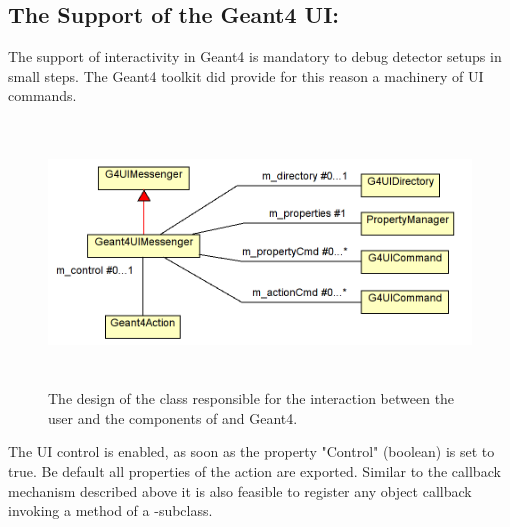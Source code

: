 \newpage
\subsection{The Support of the Geant4 UI: }
\label{sec:ddg4-user-manual-geant4action-base}

\noindent
The support of interactivity in Geant4 is mandatory to debug detector
setups in small steps. The Geant4 toolkit did provide for this reason 
a machinery of UI commands.
\begin{figure}[h]
  \begin{center}
    \includegraphics[height=70mm] {DDG4-UIMessenger.png}
    \caption{The design of the  class responsible for
        the interaction between the user and the components of \DDG and Geant4.}
    \label{fig:ddg4-tracking-action}
  \end{center}
\end{figure}

\noindent
The UI control is enabled, as soon as the property "Control" (boolean) is set to true.
Be default all properties of the action are exported.
Similar to the callback mechanism described above it is also feasible to
register any object callback invoking a method of a -subclass. 

